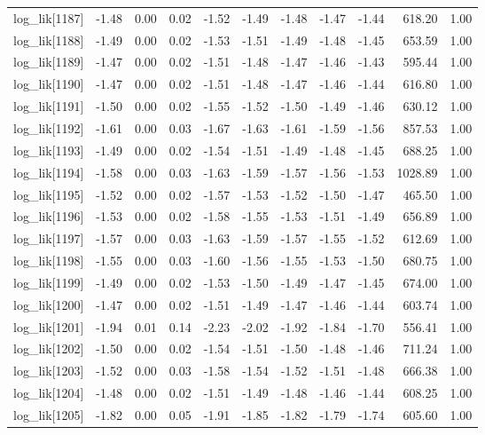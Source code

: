 \begin{table}[ht]
\begin{tabular}{rrrrrrrrrrr}
  log\_lik[1187] & -1.48 & 0.00 & 0.02 & -1.52 & -1.49 & -1.48 & -1.47 & -1.44 & 618.20 & 1.00 \\ 
  log\_lik[1188] & -1.49 & 0.00 & 0.02 & -1.53 & -1.51 & -1.49 & -1.48 & -1.45 & 653.59 & 1.00 \\ 
  log\_lik[1189] & -1.47 & 0.00 & 0.02 & -1.51 & -1.48 & -1.47 & -1.46 & -1.43 & 595.44 & 1.00 \\ 
  log\_lik[1190] & -1.47 & 0.00 & 0.02 & -1.51 & -1.48 & -1.47 & -1.46 & -1.44 & 616.80 & 1.00 \\ 
  log\_lik[1191] & -1.50 & 0.00 & 0.02 & -1.55 & -1.52 & -1.50 & -1.49 & -1.46 & 630.12 & 1.00 \\ 
  log\_lik[1192] & -1.61 & 0.00 & 0.03 & -1.67 & -1.63 & -1.61 & -1.59 & -1.56 & 857.53 & 1.00 \\ 
  log\_lik[1193] & -1.49 & 0.00 & 0.02 & -1.54 & -1.51 & -1.49 & -1.48 & -1.45 & 688.25 & 1.00 \\ 
  log\_lik[1194] & -1.58 & 0.00 & 0.03 & -1.63 & -1.59 & -1.57 & -1.56 & -1.53 & 1028.89 & 1.00 \\ 
  log\_lik[1195] & -1.52 & 0.00 & 0.02 & -1.57 & -1.53 & -1.52 & -1.50 & -1.47 & 465.50 & 1.00 \\ 
  log\_lik[1196] & -1.53 & 0.00 & 0.02 & -1.58 & -1.55 & -1.53 & -1.51 & -1.49 & 656.89 & 1.00 \\ 
  log\_lik[1197] & -1.57 & 0.00 & 0.03 & -1.63 & -1.59 & -1.57 & -1.55 & -1.52 & 612.69 & 1.00 \\ 
  log\_lik[1198] & -1.55 & 0.00 & 0.03 & -1.60 & -1.56 & -1.55 & -1.53 & -1.50 & 680.75 & 1.00 \\ 
  log\_lik[1199] & -1.49 & 0.00 & 0.02 & -1.53 & -1.50 & -1.49 & -1.47 & -1.45 & 674.00 & 1.00 \\ 
  log\_lik[1200] & -1.47 & 0.00 & 0.02 & -1.51 & -1.49 & -1.47 & -1.46 & -1.44 & 603.74 & 1.00 \\ 
  log\_lik[1201] & -1.94 & 0.01 & 0.14 & -2.23 & -2.02 & -1.92 & -1.84 & -1.70 & 556.41 & 1.00 \\ 
  log\_lik[1202] & -1.50 & 0.00 & 0.02 & -1.54 & -1.51 & -1.50 & -1.48 & -1.46 & 711.24 & 1.00 \\ 
  log\_lik[1203] & -1.52 & 0.00 & 0.03 & -1.58 & -1.54 & -1.52 & -1.51 & -1.48 & 666.38 & 1.00 \\ 
  log\_lik[1204] & -1.48 & 0.00 & 0.02 & -1.51 & -1.49 & -1.48 & -1.46 & -1.44 & 608.25 & 1.00 \\ 
  log\_lik[1205] & -1.82 & 0.00 & 0.05 & -1.91 & -1.85 & -1.82 & -1.79 & -1.74 & 605.60 & 1.00 \\ 

\end{tabular}
\end{table}

